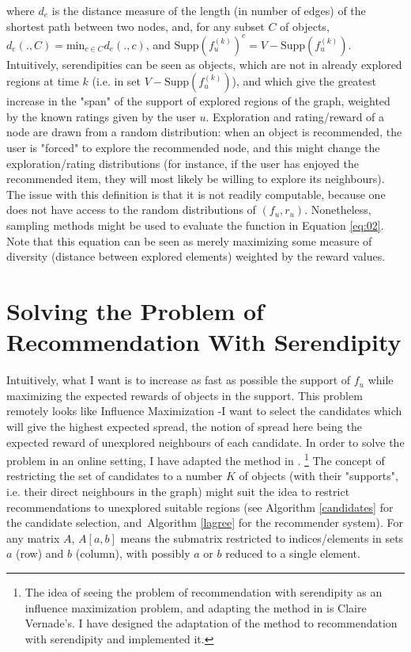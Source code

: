 \documentclass{article}
\begin{document}
where $d_e$ is the distance measure of the length (in number of edges) of the shortest path between two nodes, and, for any subset $C$ of objects, $d_e(., C) = \text{min}_{c \in C} d_e(., c)$, and $\text{Supp}(f^{(k)}_{u})^{c} = V-\text{Supp}(f^{(k)}_{u})$. Intuitively, serendipities can be seen as objects, which are not in already explored regions at time $k$ (i.e. in set $V - \text{Supp}(f^{(k)}_{u})$), and which give the greatest increase in the "span" of the support of explored regions of the graph, weighted by the known ratings given by the user $u$. Exploration and rating/reward of a node are drawn from a random distribution: when an object is recommended, the user is "forced" to explore the recommended node, and this might change the exploration/rating distributions (for instance, if the user has enjoyed the recommended item, they will most likely be willing to explore its neighbours). The issue with this definition is that it is not readily computable, because one does not have access to the random distributions of $(f_{u}, r_{u})$. Nonetheless, sampling methods might be used to evaluate the function in Equation \ref{eq:02}. Note that this equation can be seen as merely maximizing some measure of diversity (distance between explored elements) weighted by the reward values.

\section{Solving the Problem of Recommendation With Serendipity}

Intuitively, what I want is to increase as fast as possible the support of $f_{u}$ while maximizing the expected rewards of objects in the support. This problem remotely looks like Influence Maximization -I want to select the candidates which will give the highest expected spread, the notion of spread here being the expected reward of unexplored neighbours of each candidate. In order to solve the problem in an online setting, I have adapted the method in \cite{lagree2017effective}. \footnote{The idea of seeing the problem of recommendation with serendipity as an influence maximization problem, and adapting the method in \cite{lagree2017effective} is Claire Vernade's. I have designed the adaptation of the method to recommendation with serendipity and implemented it.} The concept of restricting the set of candidates to a number $K$ of objects (with their "supports", i.e. their direct neighbours in the graph) might suit the idea to restrict recommendations to unexplored suitable regions (see Algorithm \ref{candidates} for the candidate selection, and Algorithm \ref{lagree} for the recommender system). For any matrix $A$, $A[a, b]$ means the submatrix restricted to indices/elements in sets $a$ (row) and $b$ (column), with possibly $a$ or $b$ reduced to a single element.
\end{document}
